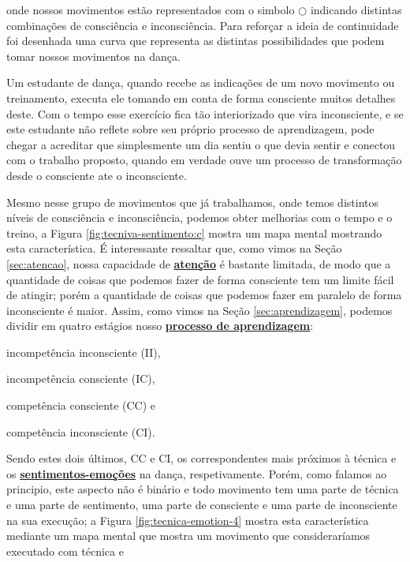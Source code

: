 onde nossos movimentos estão representados com o simbolo $\bigcirc$
indicando distintas combinações de consciência e inconsciência.
Para reforçar a ideia de continuidade foi desenhada uma curva que representa as 
distintas possibilidades que podem tomar nossos movimentos na dança.
\begin{example} Um estudante de dança, quando recebe
as indicações de um novo movimento ou treinamento, 
executa ele tomando em conta de forma consciente muitos detalhes deste.
Com o tempo esse exercício fica tão interiorizado que vira inconsciente,
e se este estudante não reflete sobre seu próprio processo de aprendizagem, pode chegar a acreditar 
que simplesmente um dia sentiu o que devia sentir e conectou com o trabalho proposto,
quando em verdade ouve um processo de transformação desde o consciente ate o inconsciente.
\end{example}
Mesmo nesse grupo de movimentos que já trabalhamos, 
onde temos distintos níveis de consciência  e inconsciência,
podemos obter melhorias com o tempo e o treino, a Figura \ref{fig:tecniva-sentimento:c} 
mostra um mapa mental mostrando esta característica.
É interessante ressaltar que, como vimos na Seção \ref{sec:atencao}, 
nossa capacidade de \hyperref[sec:atencao]{\textbf{atenção}} 
é bastante limitada, de modo que a quantidade de coisas que podemos fazer de forma consciente 
tem um limite fácil de atingir; porém a quantidade de coisas que podemos fazer em paralelo de 
forma inconsciente é maior.
Assim, como vimos na Seção \ref{sec:aprendizagem}, 
podemos dividir em quatro estágios nosso \hyperref[sec:aprendizagem]{\textbf{processo de aprendizagem}}:
\begin{inparaitem}
\item incompetência inconsciente (II), \item incompetência consciente (IC), 
\item competência consciente (CC) e \item competência inconsciente (CI).
\end{inparaitem}
Sendo estes dois últimos, CC e CI, 
os correspondentes mais próximos à técnica e os 
\hyperref[ref:emotionsentimental]{\textbf{sentimentos-emoções}} na dança, respetivamente. 
Porém, como falamos ao principio, este aspecto não é binário e todo movimento 
tem uma parte de técnica e uma parte de sentimento, 
uma parte de consciente e uma parte de inconsciente na sua execução;
a Figura \ref{fig:tecnica-emotion-4} mostra esta característica mediante um mapa mental
que mostra um movimento que consideraríamos executado com técnica e 
